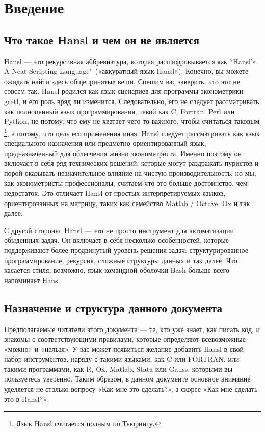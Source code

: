 \documentclass[oneside]{book}
\begin{document}
\chapter{Введение}

\section*{Что такое Hansl и чем он не является}

Hansl --- это рекурсивная аббревиатура, которая расшифровывается как
“Hansl’s A Neat Scripting Language” («аккуратный язык
Hansl»). Конечно, вы можете ожидать найти здесь общепринятые
вещи. Спешим вас заверить, что это не совсем так. Hansl родился как
язык сценариев для программы эконометрики gretl, и его роль вряд ли
изменится. Следовательно, его не следует рассматривать как полноценный
язык программирования, такой как C, Fortran, Perl или Python, не
потому, что ему не хватает чего-то важного, чтобы считаться таковым
\footnote{Язык Hansl считается полным по Тьюрингу.}, а потому, что
цель его применения иная. Hansl следует рассматривать как язык
специального назначения или предметно-ориентированный язык,
предназначенный для облегчения жизни эконометриста. Именно поэтому он
включает в себя ряд технических решений, которые могут раздражать
пуристов и порой оказывать незначительное влияние на чистую
производительность, но мы, как эконометристы-профессионалы, считаем
что это больше достоинство, чем недостаток. Это отличает Hansl от
простых интерпретируемых языков, ориентированных на матрицу, таких как
семейство Matlab / Octave, Ox и так далее.

С другой стороны, Hansl --- это не просто инструмент для автоматизации
обыденных задач. Он включает в себя несколько особенностей, которые
поддерживают более продвинутый уровень решения задач:
структурированное программирование, рекурсия, сложные структуры данных
и так далее. Что касается стиля, возможно, язык командной оболочки
Bash больше всего напоминает Hansl.

\section*{Назначение и структура данного документа}

Предполагаемые читатели этого документа --- те, кто уже знает, как
писать код, и знакомы с соответствующими правилами, которые определяют
всевозможные «можно» и «нельзя». У вас может появиться желание
добавить Hansl в свой набор инструментов, наряду с такими языками, как
C или FORTRAN, или такими программами, как R, Ox, Matlab, Stata или
Gauss, которыми вы пользуетесь уверенно. Таким образом, в данном
документе основное внимание уделяется не столько вопросу «Как мне это
сделать?», а скорее «Как мне сделать это в Hansl?».
\end{document}
